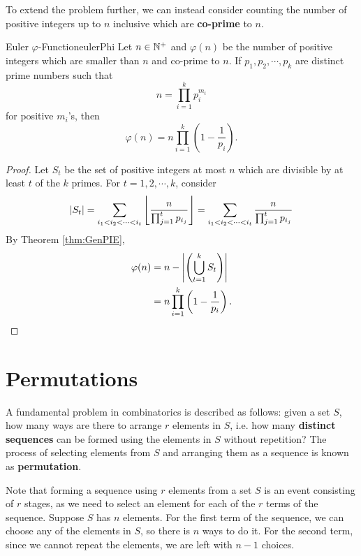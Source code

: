 \documentclass[math]{amznotes}
\theoremstyle{remark}
\newcommand{\0}{\mathbf{0}}
\newcommand{\1}{\mathbf{1}}
\begin{document}
To extend the problem further, we can instead consider counting the number of positive integers up to $n$ inclusive which are \textbf{co-prime} to $n$.
\begin{thmbox}{Euler $\varphi$-Function}{eulerPhi}
    Let $n \in \mathbb{N}^+$ and $\varphi(n)$ be the number of positive integers which are smaller than $n$ and co-prime to $n$. If $p_1, p_2, \cdots, p_k$ are distinct prime numbers such that
    \begin{equation*}
        n = \prod_{i = 1}^{k}p_i^{m_i}
    \end{equation*} 
    for positive $m_i$'s, then
    \begin{equation*}
        \varphi(n) = n\prod_{i = 1}^{k}\left(1 - \frac{1}{p_i}\right).
    \end{equation*}
    \tcblower
    \begin{proof}
        Let $S_t$ be the set of positive integers at most $n$ which are divisible by at least $t$ of the $k$ primes. For $t = 1, 2, \cdots, k$, consider
        \begin{equation*}
            {\left\lvert {S_t} \right\rvert} = \sum_{i_1 < i_2 < \cdots < i_t}\left\lfloor\frac{n}{\prod_{j = 1}^{t}p_{i_j}}\right\rfloor = \sum_{i_1 < i_2 < \cdots < i_t}\frac{n}{\prod_{j = 1}^{t}p_{i_j}}
        \end{equation*}
        By Theorem \ref{thm:GenPIE},
        \begin{align*}
            \varphi(n) & = n - {\left\lvert {\left(\bigcup_{t = 1}^{k}S_t\right)} \right\rvert} \\
            & = n\prod_{i = 1}^{k}\left(1 - \frac{1}{p_i}\right).
        \end{align*}
    \end{proof}
\end{thmbox}
\section{Permutations}
A fundamental problem in combinatorics is described as follows: given a set $S$, how many ways are there to arrange $r$ elements in $S$, i.e. how many \textbf{distinct sequences} can be formed using the elements in $S$ without repetition? The process of selecting elements from $S$ and arranging them as a sequence is known as \textbf{permutation}.

Note that forming a sequence using $r$ elements from a set $S$ is an event consisting of $r$ stages, as we need to select an element for each of the $r$ terms of the sequence. Suppose $S$ has $n$ elements. For the first term of the sequence, we can choose any of the elements in $S$, so there is $n$ ways to do it. For the second term, since we cannot repeat the elements, we are left with $n - 1$ choices. 
\end{document}

